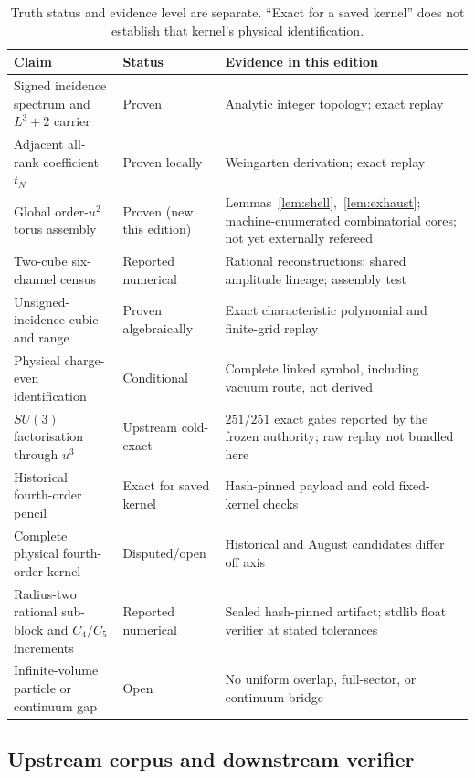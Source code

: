 \documentclass[11pt]{article}
\theoremstyle{plain}
\theoremstyle{definition}
\theoremstyle{remark}
\begin{document}
\begin{table}[ht]
\centering
\small
\begin{tabular}{@{}p{}p{}p{}@{}}
\toprule
Claim & Status & Evidence in this edition \\
\midrule
Signed incidence spectrum and $L^3+2$ carrier
 & Proven & Analytic integer topology; exact replay \\
Adjacent all-rank coefficient $t_N$
 & Proven locally & Weingarten derivation; exact replay \\
Global order-$u^2$ torus assembly
 & Proven (new this edition) & Lemmas~\ref{lem:shell},~\ref{lem:exhaust}; machine-enumerated combinatorial cores; not yet externally refereed \\
Two-cube six-channel census
 & Reported numerical & Rational reconstructions; shared amplitude lineage; assembly test \\
Unsigned-incidence cubic and range
 & Proven algebraically & Exact characteristic polynomial and finite-grid replay \\
Physical charge-even identification
 & Conditional & Complete linked symbol, including vacuum route, not derived \\
$SU(3)$ factorisation through $u^3$
 & Upstream cold-exact & $251/251$ exact gates reported by the frozen authority; raw replay not bundled here \\
Historical fourth-order pencil
 & Exact for saved kernel & Hash-pinned payload and cold fixed-kernel checks \\
Complete physical fourth-order kernel
 & Disputed/open & Historical and August candidates differ off axis \\
Radius-two rational sub-block and $C_4$/$C_5$ increments
 & Reported numerical & Sealed hash-pinned artifact; stdlib float verifier at stated tolerances \\
Infinite-volume particle or continuum gap
 & Open & No uniform overlap, full-sector, or continuum bridge \\
\bottomrule
\end{tabular}
\caption{Truth status and evidence level are separate. ``Exact for a saved
kernel'' does not establish that kernel's physical identification.}
\label{tab:evidence}
\end{table}

\subsection{Upstream corpus and downstream verifier}
\end{document}
